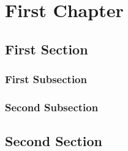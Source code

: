 
\chapter{First Chapter}

\lipsum[1-2]

\section{First Section}

\lipsum[3-6]

\subsection{First Subsection}

\lipsum[9-10]

\subsection{Second Subsection}

\lipsum[11-12]

\section{Second Section}

\lipsum[17-20]